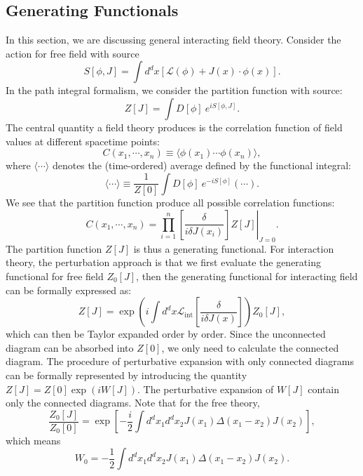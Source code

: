 \documentclass[aps,prb,superscriptaddress,nofootinbib]{revtex4}
\begin{document}
\subsection{Generating Functionals}
In this section, we are discussing general interacting field theory.
Consider the action for free field with source
\begin{equation}
	S[\phi,J]
	= \int d^dx\left[\mathcal{L}(\phi) + J(x)\cdot\phi(x) \right].
\end{equation}
In the path integral formalism, we consider the partition function with source:
\begin{equation}
	Z[J] = \int D[\phi]\ e^{iS[\phi,J]}.
\end{equation}
The central quantity a field theory produces is the correlation function of field values at different spacetime points:
\begin{equation}
	C(x_1,\cdots,x_n) \equiv \langle \phi(x_1)\cdots \phi(x_n)\rangle,
\end{equation}
where $\langle \cdots \rangle$ denotes the (time-ordered) average defined by the functional integral:
\begin{equation}
	\langle \cdots \rangle \equiv \frac{1}{Z[0]}\int D[\phi]\ e^{-iS[\phi]} (\cdots).
\end{equation}
We see that the partition function produce all possible correlation functions:
\begin{equation}
	C(x_1,\cdots,x_n) = \left. \prod_{i=1}^n \left[\frac{\delta}{i\delta J(x_i)}\right] Z[J] \right|_{J=0}.
\end{equation}
The partition function $Z[J]$ is thus a generating functional.
For interaction theory, the perturbation approach is that we first evaluate the generating functional for free field $Z_0[J]$, then the generating functional for interacting field can be formally expressed as:
\begin{equation}
	Z[J] = \exp\left(i\int d^dx \mathcal{L}_{\mathrm{int}}\left[\frac{\delta}{i\delta J(x)}\right]\right)Z_0[J],
\end{equation}
which can then be Taylor expanded order by order.
Since the unconnected diagram can be absorbed into $Z[0]$, we only need to calculate the connected diagram.
The procedure of perturbative expansion with only connected diagrams can be formally represented by introducing the quantity $Z[J] = Z[0]\exp\left(i W[J]\right)$.
The perturbative expansion of $W[J]$ contain only the connected diagrams.
Note that for the free theory,
\begin{equation*}
	\frac{Z_0[J]}{Z_0[0]} = \exp\left[-\frac{i}{2}\int d^d x_1 d^d x_2 J(x_1) \Delta(x_1-x_2)J(x_2)\right],
\end{equation*}
which means
\begin{equation*}
	W_0 = -\frac{1}{2}\int d^d x_1 d^d x_2 J(x_1) \Delta(x_1-x_2)J(x_2).
\end{equation*}
\end{document}
